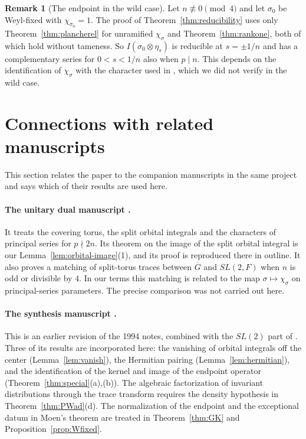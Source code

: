 \documentclass[12pt,letterpaper]{article}
\numberwithin{equation}{section}
\theoremstyle{definition}
\newtheorem{remark}[theorem]{Remark}
\newcommand{\bG}{\overline{G}}
\begin{document}
\begin{remark}[The endpoint in the wild case]\label{rem:wild-endpoint}
Let $n\not\equiv0\pmod4$ and let $\sigma_0$ be Weyl-fixed with $\chi_{\sigma_0}=1$.  The proof
of Theorem~\ref{thm:reducibility} uses only Theorem~\ref{thm:plancherel} for unramified
$\chi_\sigma$ and Theorem~\ref{thm:rankone}, both of which hold without tameness.  So
$I(\sigma_0\otimes\eta_s)$ is reducible at $s=\pm1/n$ and has a complementary series for
$0<s<1/n$ also when $p\mid n$.  This depends on the identification of $\chi_\sigma$ with
the character used in \cite{Sz19}, which we did not verify in the wild case.
\end{remark}

\section{Connections with related manuscripts}\label{sec:connections}

This section relates the paper to the companion manuscripts in the same project and
says which of their results are used here.

\paragraph{The unitary dual manuscript \cite{JoUD}.}  It treats the covering torus, the
split orbital integrals and the characters of principal series for $p\nmid2n$.  Its
theorem on the image of the split orbital integral is our Lemma~\ref{lem:orbital-image}(1),
and its proof is reproduced there in outline.  It also proves a matching of split-torus
traces between $\bG$ and $SL(2,F)$ when $n$ is odd or divisible by $4$.  In our terms this
matching is related to the map $\sigma\mapsto\chi_\sigma$ on principal-series parameters.
The precise comparison was not carried out here.

\paragraph{The synthesis manuscript \cite{JoSyn}.}  This is an earlier revision of
the 1994 notes, combined with the $SL(2)$ part of \cite{Jo01}. Three of its results
are incorporated here: the vanishing of orbital integrals off the center
(Lemma~\ref{lem:vanish}), the Hermitian pairing (Lemma~\ref{lem:hermitian}),
and the identification of the kernel and image of the endpoint operator
(Theorem~\ref{thm:special}(a),(b)). The algebraic factorization of invariant
distributions through the trace transform requires the density hypothesis
in Theorem~\ref{thm:PWad}(d). The normalization of the endpoint and the
exceptional datum in Moen's theorem are treated in Theorem~\ref{thm:GK}
and Proposition~\ref{prop:Wfixed}.
\end{document}
